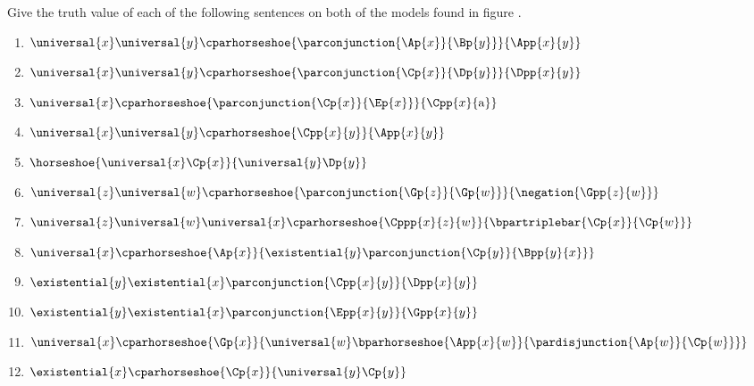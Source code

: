  Give the truth value of each of the following sentences on both of the models found in figure . 
\begin{multicols}{2}
\begin{enumerate}
\item {$\universal{\variable{x}}\universal{\variable{y}}\cparhorseshoe{\parconjunction{\Ap{\variable{x}}}{\Bp{\variable{y}}}}{\App{\variable{x}}{\variable{y}}}$}
\item {$\universal{\variable{x}}\universal{\variable{y}}\cparhorseshoe{\parconjunction{\Cp{\variable{x}}}{\Dp{\variable{y}}}}{\Dpp{\variable{x}}{\variable{y}}}$}
\item {$\universal{\variable{x}}\cparhorseshoe{\parconjunction{\Cp{\variable{x}}}{\Ep{\variable{x}}}}{\Cpp{\variable{x}}{\constant{a}}}$}
\item {$\universal{\variable{x}}\universal{\variable{y}}\cparhorseshoe{\Cpp{\variable{x}}{\variable{y}}}{\App{\variable{x}}{\variable{y}}}$}
\item {$\horseshoe{\universal{\variable{x}}\Cp{\variable{x}}}{\universal{\variable{y}}\Dp{\variable{y}}}$}
\item {$\universal{\variable{z}}\universal{\variable{w}}\cparhorseshoe{\parconjunction{\Gp{\variable{z}}}{\Gp{\variable{w}}}}{\negation{\Gpp{\variable{z}}{\variable{w}}}}$}
\item {$\universal{\variable{z}}\universal{\variable{w}}\universal{\variable{x}}\cparhorseshoe{\Cppp{\variable{x}}{\variable{z}}{\variable{w}}}{\bpartriplebar{\Cp{\variable{x}}}{\Cp{\variable{w}}}}$}
\item {$\universal{\variable{x}}\cparhorseshoe{\Ap{\variable{x}}}{\existential{\variable{y}}\parconjunction{\Cp{\variable{y}}}{\Bpp{\variable{y}}{\variable{x}}}}$}
\item {$\existential{\variable{y}}\existential{\variable{x}}\parconjunction{\Cpp{\variable{x}}{\variable{y}}}{\Dpp{\variable{x}}{\variable{y}}}$}
\item {$\existential{\variable{y}}\existential{\variable{x}}\parconjunction{\Epp{\variable{x}}{\variable{y}}}{\Gpp{\variable{x}}{\variable{y}}}$}
\item {$\universal{\variable{x}}\cparhorseshoe{\Gp{\variable{x}}}{\universal{\variable{w}}\bparhorseshoe{\App{\variable{x}}{\variable{w}}}{\pardisjunction{\Ap{\variable{w}}}{\Cp{\variable{w}}}}}$}
\item {$\existential{\variable{x}}\cparhorseshoe{\Cp{\variable{x}}}{\universal{\variable{y}}\Cp{\variable{y}}}$}

\end{enumerate}
\end{multicols}
